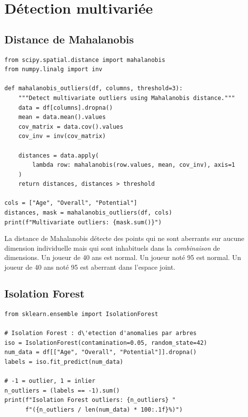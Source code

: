 \section{D\'etection multivari\'ee}

\subsection{Distance de Mahalanobis}

\begin{verbatim}
from scipy.spatial.distance import mahalanobis
from numpy.linalg import inv

def mahalanobis_outliers(df, columns, threshold=3):
    """Detect multivariate outliers using Mahalanobis distance."""
    data = df[columns].dropna()
    mean = data.mean().values
    cov_matrix = data.cov().values
    cov_inv = inv(cov_matrix)

    distances = data.apply(
        lambda row: mahalanobis(row.values, mean, cov_inv), axis=1
    )
    return distances, distances > threshold

cols = ["Age", "Overall", "Potential"]
distances, mask = mahalanobis_outliers(df, cols)
print(f"Multivariate outliers: {mask.sum()}")
\end{verbatim}

\begin{preprocesstip}
La distance de Mahalanobis d\'etecte des points qui ne sont aberrants sur aucune dimension individuelle mais qui sont inhabituels dans la \emph{combinaison} de dimensions. Un joueur de 40 ans est normal. Un joueur not\'e 95 est normal. Un joueur de 40 ans not\'e 95 est aberrant dans l'espace joint.
\end{preprocesstip}

\subsection{Isolation Forest}

\begin{verbatim}
from sklearn.ensemble import IsolationForest

# Isolation Forest : d\'etection d'anomalies par arbres
iso = IsolationForest(contamination=0.05, random_state=42)
num_data = df[["Age", "Overall", "Potential"]].dropna()
labels = iso.fit_predict(num_data)

# -1 = outlier, 1 = inlier
n_outliers = (labels == -1).sum()
print(f"Isolation Forest outliers: {n_outliers} "
      f"({n_outliers / len(num_data) * 100:.1f}%)")
\end{verbatim}

